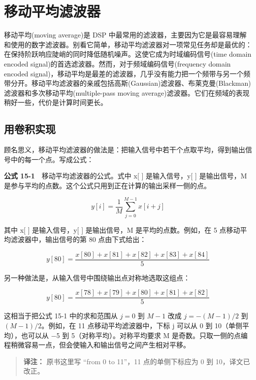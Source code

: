 
\chapter{移动平均滤波器}\label{ch-15}

移动平均(moving average)是 DSP
中最常用的滤波器，主要因为它是最容易理解和使用的数字滤波器。别看它简单，移动平均滤波器对一项常见任务却是最优的：在保持阶跃响应陡峭的同时降低随机噪声。这使它成为时域编码信号(time
domain encoded signal)的首选滤波器。然而，对于频域编码信号(frequency
domain encoded
signal)，移动平均是最差的滤波器，几乎没有能力把一个频带与另一个频带分开。移动平均滤波器的亲戚包括高斯(Gaussian)滤波器、布莱克曼(Blackman)滤波器和多次移动平均(multiple-pass
moving average)滤波器。它们在频域的表现稍好一些，代价是计算时间更长。

\section{用卷积实现}

顾名思义，移动平均滤波器的做法是：把输入信号中若干个点取平均，得到输出信号中的每一个点。写成公式：

\textbf{公式 15-1}　移动平均滤波器的公式。式中 x{[} {]} 是输入信号，y{[}
{]} 是输出信号，M
是参与平均的点数。这个公式只用到正在计算的输出采样一侧的点。

\[y[i] = \frac{1}{M} \sum_{j=0}^{M-1} x[i+j]\]

其中 x{[} {]} 是输入信号，y{[} {]} 是输出信号，M 是平均的点数。例如，在
5 点移动平均滤波器中，输出信号的第 80 点由下式给出：

\[y[80] = \frac{x[80] + x[81] + x[82] + x[83] + x[84]}{5}\]

另一种做法是，从输入信号中围绕输出点对称地选取这组点：

\[y[80] = \frac{x[78] + x[79] + x[80] + x[81] + x[82]}{5}\]

这相当于把公式 15-1 中的求和范围从 \(j = 0\) 到 \(M-1\) 改成
\(j = -(M-1)/2\) 到 \((M-1)/2\)。例如，在 11 点移动平均滤波器中，下标 j
可以从 0 到 10（单侧平均），也可以从 −5 到 5（对称平均）。对称平均要求 M
是奇数。只取一侧的点编程稍微容易一点，但会使输入和输出信号之间产生相对平移。

\begin{quote}
\textbf{译注：} 原书这里写 ``from 0 to 11''，11 点的单侧下标应为 0 到
10，译文已改正。
\end{quote}

